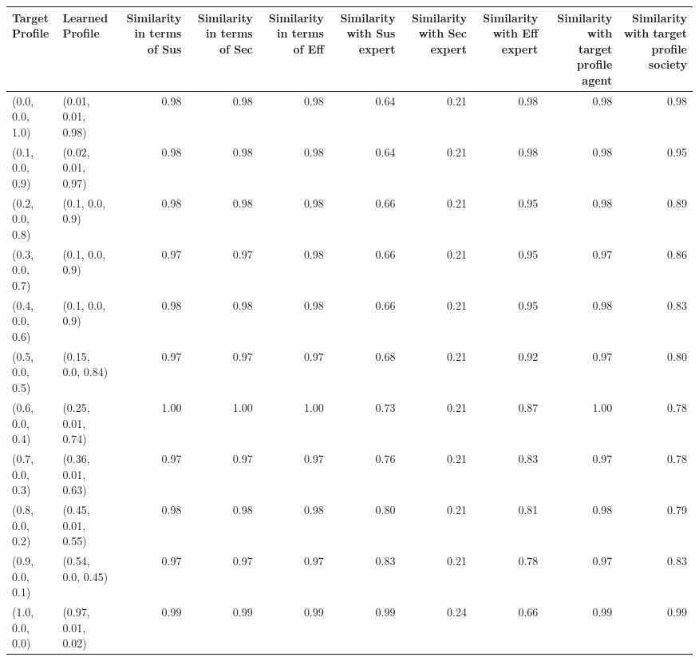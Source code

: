 \begin{tabular}{llrrrrrrrr}
\toprule
Target Profile & Learned Profile & Similarity in terms of Sus & Similarity in terms of Sec & Similarity in terms of Eff & Similarity with Sus expert & Similarity with Sec expert & Similarity with Eff expert & Similarity with target profile agent & Similarity with target profile society \\
\midrule
(0.0, 0.0, 1.0) & (0.01, 0.01, 0.98) & 0.98 & 0.98 & 0.98 & 0.64 & 0.21 & 0.98 & 0.98 & 0.98 \\
(0.1, 0.0, 0.9) & (0.02, 0.01, 0.97) & 0.98 & 0.98 & 0.98 & 0.64 & 0.21 & 0.98 & 0.98 & 0.95 \\
(0.2, 0.0, 0.8) & (0.1, 0.0, 0.9) & 0.98 & 0.98 & 0.98 & 0.66 & 0.21 & 0.95 & 0.98 & 0.89 \\
(0.3, 0.0, 0.7) & (0.1, 0.0, 0.9) & 0.97 & 0.97 & 0.98 & 0.66 & 0.21 & 0.95 & 0.97 & 0.86 \\
(0.4, 0.0, 0.6) & (0.1, 0.0, 0.9) & 0.98 & 0.98 & 0.98 & 0.66 & 0.21 & 0.95 & 0.98 & 0.83 \\
(0.5, 0.0, 0.5) & (0.15, 0.0, 0.84) & 0.97 & 0.97 & 0.97 & 0.68 & 0.21 & 0.92 & 0.97 & 0.80 \\
(0.6, 0.0, 0.4) & (0.25, 0.01, 0.74) & 1.00 & 1.00 & 1.00 & 0.73 & 0.21 & 0.87 & 1.00 & 0.78 \\
(0.7, 0.0, 0.3) & (0.36, 0.01, 0.63) & 0.97 & 0.97 & 0.97 & 0.76 & 0.21 & 0.83 & 0.97 & 0.78 \\
(0.8, 0.0, 0.2) & (0.45, 0.01, 0.55) & 0.98 & 0.98 & 0.98 & 0.80 & 0.21 & 0.81 & 0.98 & 0.79 \\
(0.9, 0.0, 0.1) & (0.54, 0.0, 0.45) & 0.97 & 0.97 & 0.97 & 0.83 & 0.21 & 0.78 & 0.97 & 0.83 \\
(1.0, 0.0, 0.0) & (0.97, 0.01, 0.02) & 0.99 & 0.99 & 0.99 & 0.99 & 0.24 & 0.66 & 0.99 & 0.99 \\
\bottomrule
\end{tabular}
